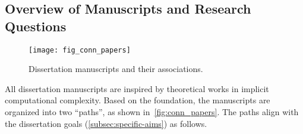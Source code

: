 
\subsection{Overview of Manuscripts and Research Questions}
\label{subsec:conn-papers}

\begin{figure}[p]
\texttt{[image: fig\_conn\_papers]}\vspace{1em}
\caption[Dissertation manuscripts and their associations]
{Dissertation manuscripts and their associations.}
\label{fig:conn_papers}
\end{figure}

All dissertation manuscripts are inspired by theoretical works in implicit computational complexity.
Based on the foundation, the manuscripts are organized into two \enquote{paths}, as shown in~\autoref{fig:conn_papers}.
The paths align with the dissertation goals (\autoref{subsec:specific-aims}) as follows.


